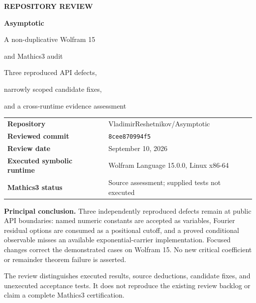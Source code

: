 \documentclass[11pt,letterpaper]{article}
\begin{document}
\begin{titlepage}
\vspace*{0.35in}
{\sffamily\bfseries\color{ink}\large REPOSITORY REVIEW\par}
\vspace{0.3in}
{\sffamily\bfseries\color{ink}\Huge Asymptotic\par}
\vspace{0.15in}
{\sffamily\LARGE A non-duplicative Wolfram 15\par and Mathics3 audit\par}
\vspace{0.32in}
{\Large Three reproduced API defects,\par narrowly scoped candidate fixes,\par and a cross-runtime evidence assessment\par}
\vspace{0.45in}
\begin{tabular}{@{}ll@{}}
\textbf{Repository} & VladimirReshetnikov/Asymptotic\\[0.45em]
\textbf{Reviewed commit} & \texttt{8cee870994f5}\\[0.45em]
\textbf{Review date} & September 10, 2026\\[0.45em]
\textbf{Executed symbolic runtime} & Wolfram Language 15.0.0, Linux x86-64\\[0.45em]
\textbf{Mathics3 status} & Source assessment; supplied tests not executed\\
\end{tabular}
\vfill
\begin{minipage}{0.96\textwidth}
\textbf{Principal conclusion.} Three independently reproduced defects remain at public API boundaries: named numeric constants are accepted as variables, Fourier residual options are consumed as a positional cutoff, and a proved conditional observable misses an available exponential-carrier implementation. Focused changes correct the demonstrated cases on Wolfram 15. No new critical coefficient or remainder theorem failure is asserted.

The review distinguishes executed results, source deductions, candidate fixes, and unexecuted acceptance tests. It does not reproduce the existing review backlog or claim a complete Mathics3 certification.
\end{minipage}
\end{titlepage}

\begingroup
\small
\setlength{\parskip}{0pt}
\tableofcontents
\endgroup
\newpage
\end{document}
